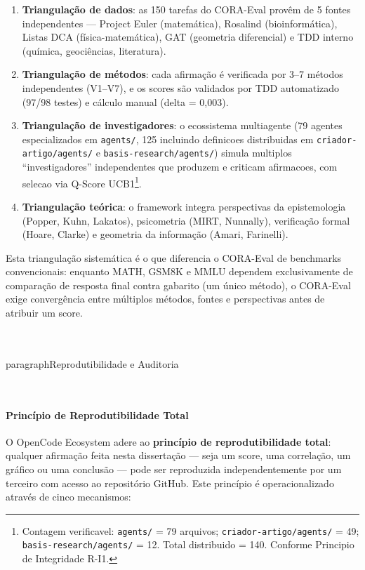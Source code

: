 \begin{enumerate}[label=(\roman*)]
\item \textbf{Triangulação de dados}: as 150 tarefas do CORA-Eval provêm de
      5 fontes independentes — Project Euler (matemática), Rosalind
      (bioinformática), Listas DCA (física-matemática), GAT (geometria
      diferencial) e TDD interno (química, geociências, literatura).
\item \textbf{Triangulação de métodos}: cada afirmação é verificada por 3--7
      métodos independentes (V1--V7), e os scores são validados por TDD
      automatizado (97/98 testes) e cálculo manual (delta = 0,003).
\item \textbf{Triangulação de investigadores}: o ecossistema multiagente
       (79 agentes especializados em \texttt{agents/}, 125 incluindo
       definicoes distribuidas em \texttt{criador-artigo/agents/} e
       \texttt{basis-research/agents/}) simula multiplos ``investigadores''
       independentes que produzem e criticam afirmacoes, com selecao via
       Q-Score UCB1\footnote{Contagem verificavel: \texttt{agents/} = 79
       arquivos; \texttt{criador-artigo/agents/} = 49; \texttt{basis-research/agents/}
       = 12. Total distribuido = 140. Conforme Principio de Integridade R-I1.}.
\item \textbf{Triangulação teórica}: o framework integra perspectivas da
      epistemologia (Popper, Kuhn, Lakatos), psicometria (MIRT, Nunnally),
      verificação formal (Hoare, Clarke) e geometria da informação (Amari,
      Farinelli).
\end{enumerate}

Esta triangulação sistemática é o que diferencia o CORA-Eval de benchmarks
convencionais: enquanto MATH, GSM8K e MMLU dependem exclusivamente de
comparação de resposta final contra gabarito (um único método), o CORA-Eval
exige convergência entre múltiplos métodos, fontes e perspectivas antes de
atribuir um score.

\\\\paragraph{Reprodutibilidade e Auditoria}

\\\paragraph{Princípio de Reprodutibilidade Total}

O OpenCode Ecosystem adere ao \textbf{princípio de reprodutibilidade total}:
qualquer afirmação feita nesta dissertação — seja um score, uma correlação,
um gráfico ou uma conclusão — pode ser reproduzida independentemente por um
terceiro com acesso ao repositório GitHub. Este princípio é operacionalizado
através de cinco mecanismos:

